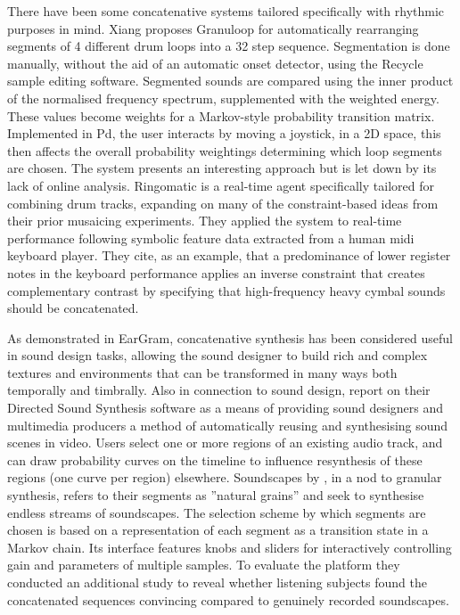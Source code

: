 There have been some concatenative systems tailored specifically with rhythmic purposes in mind. Xiang proposes Granuloop \citep{Xiang2002} for automatically rearranging segments of 4 different drum loops into a 32 step sequence. Segmentation is done manually, without the aid of an automatic onset detector, using the Recycle sample editing software. Segmented sounds are compared using the inner product of the normalised frequency spectrum, supplemented with the weighted energy. These values become weights for a Markov-style probability transition matrix. Implemented in Pd, the user interacts by moving a joystick, in a 2D space, this then affects the overall probability weightings determining which loop segments are chosen. The system presents an interesting approach but is let down by its lack of online analysis. Ringomatic \citep{Aucouturier2005} is a real-time agent specifically tailored for combining drum tracks, expanding on many of the constraint-based ideas from their prior musaicing experiments. They applied the system to real-time performance following symbolic feature data extracted from a human \acrshort{midi} keyboard player. They cite, as an example, that a predominance of lower register notes in the keyboard performance applies an inverse constraint that creates complementary contrast by specifying that high-frequency heavy cymbal sounds should be concatenated.

As demonstrated in EarGram, concatenative synthesis has been considered useful in sound design tasks, allowing the sound designer to build rich and complex textures and environments that can be transformed in many ways both temporally and timbrally. Also in connection to sound design, \cite{Cardle2003} report on their Directed Sound Synthesis software as a means of providing sound designers and multimedia producers a method of automatically reusing and synthesising sound scenes in video. Users select one or more regions of an existing audio track, and can draw probability curves on the timeline to influence resynthesis of these regions (one curve per region) elsewhere. Soundscapes by \cite{Hoskinson2001}, in a nod to granular synthesis, refers to their segments as ”natural grains” and seek to synthesise endless streams of soundscapes. The selection scheme by which segments are chosen is based on a representation of each segment as a transition state in a Markov chain. Its interface features knobs and sliders for interactively controlling gain and parameters of multiple samples. To evaluate the platform they conducted an additional study \citep{Hoskinson2007} to reveal whether listening subjects found the concatenated sequences convincing compared to genuinely recorded soundscapes.

